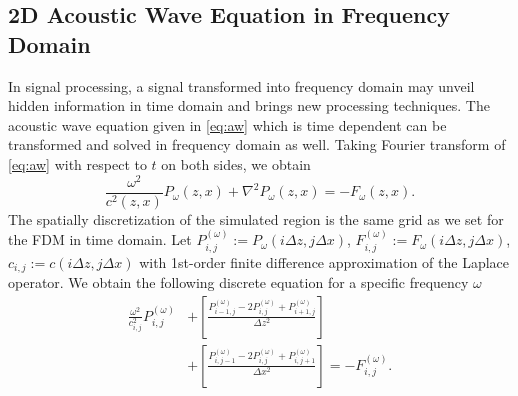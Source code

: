 \documentclass[11pt,titlepage]{article}
\theoremstyle{plain}
\theoremstyle{definition}
\theoremstyle{remark}
\numberwithin{equation}{section}
\begin{document}
\subsection{2D Acoustic Wave Equation in Frequency Domain}
In signal processing, a signal transformed into frequency domain may unveil hidden information in time domain and brings new processing
techniques. The acoustic wave equation given in \eqref{eq:aw} which is time dependent can be transformed and solved in frequency domain as well. 
Taking Fourier transform of \eqref{eq:aw} with respect to $t$ on both sides, we obtain
  \begin{equation}
  \frac{\omega^2}{c^2(z, x)}P_{\omega}(z, x) + \nabla^2 P_{\omega}(z, x) =- F_{\omega}(z, x).
  \end{equation}
 The spatially discretization of the simulated region is the same grid as we set for the FDM in time domain.  
  Let $P_{i,j}^{(\omega)} := P_{\omega}(i\Delta z, j\Delta x)$, $F_{i,j}^{(\omega)} := 
  F_{\omega}(i\Delta z, j\Delta x)$, $c_{i,j} := c(i\Delta z, j\Delta x)$  with 1st-order finite difference approximation of the Laplace operator.
  We obtain the following discrete equation for a specific frequency $\omega$
  \begin{equation}
  \begin{aligned}
  \frac{\omega^2}{c_{i,j}^2} P_{i,j}^{(\omega)} &+\left[ \frac{P_{i-1,j}^{(\omega)} - 2P_{i,j}^{(\omega)} + P_{i+1,j}^{(\omega)}}{\Delta z^2} \right] \\&+\left[ \frac{P_{i,j-1}^{(\omega)} - 2P_{i,j}^{(\omega)} + P_{i,j+1}^{(\omega)}}{\Delta x^2} \right] =- F_{i,j}^{(\omega)}.
  \end{aligned}
  \end{equation}
  
\end{document}
